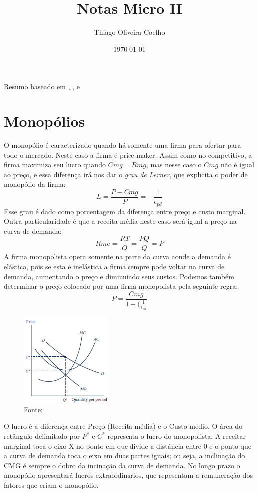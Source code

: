 \documentclass[12pt,a4paper,oneside,brazil]{abntex2}
\title{Notas Micro II}
\author{Thiago Oliveira Coelho}
\date{\today}
\begin{document}
\pagestyle{headings}
\maketitle
\begin{center}
Resumo baseado em \cite{mas}, \cite{nicholson}, \cite{varian} e \cite{pindyck}
\end{center}
\tableofcontents

\chapter{Monopólios}
O monopólio é caracterizado quando há somente uma firma para ofertar para todo o mercado. Neste caso a firma é price-maker. Assim como no competitivo, a firma maximiza seu lucro quando $Cmg = Rmg$, mas nesse caso o $Cmg$ não é igual ao preço, e essa diferença irá nos dar o \emph{grau de Lerner}, que explicita o poder de monopólio da firma:
\[ L = \frac{P - Cmg}{P} = -\frac{1}{\epsilon_{pd}}\]
Esse grau é dado como porcentagem da diferença entre preço e custo marginal. \newline
Outra particularidade é que a receita média neste caso será igual a preço na curva de demanda:
\[ Rme = \frac{RT}{Q} = \frac{P Q}{Q} = P \]
A firma monopolista opera somente na parte da curva aonde a demanda é elástica, pois se esta é inelástica a firma sempre pode voltar na curva de demanda, aumentando o preço e diminuindo seus custos. Podemos também determinar o preço colocado por uma firma monopolista pela seguinte regra:
\[ P = \frac{Cmg}{1 + (\frac{1}{\epsilon_{pd}}}\]

\begin{figure}
	\includegraphics[width=0.4\textwidth]{Monopoly.png}
	\centering
	\caption{Fonte: \cite{nicholson}}
\end{figure}
O lucro é a diferença entre Preço (Receita média) e o Custo médio. O área do retângulo delimitado por $P^*$ e  $C^*$ representa o lucro do monopolista. A receitar marginal toca o eixo X no ponto em que divide a distância entre 0 e o ponto que a curva de demanda toca o eixo em duas partes iguais; ou seja, a inclinação do CMG é sempre o dobro da incinação da curva de demanda. No longo prazo o monopólio apresentará lucros extraordinários, que repesentam a remuneração dos fatores que criam o monopólio.
\clearpage
\end{document}
